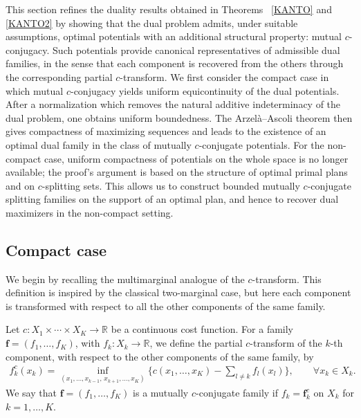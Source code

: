 \documentclass[twoside,11pt,a4paper]{article}
\newcommand*{\SavedRef}{}
\let\SavedRef\ref
\renewcommand*{\ref}[1]{  \begingroup
    \hypersetup{
      linkcolor=linkequation,
      linkbordercolor=linkequation,
    }    \SavedRef{#1}  \endgroup
}
\begin{document}
This section refines the duality results obtained in Theorems~\ref{KANTO} and~\ref{KANTO2} by showing that the dual problem admits, under suitable assumptions, optimal potentials with an additional structural property: mutual \(c\)-conjugacy. Such potentials provide canonical representatives of admissible dual families, in the sense that each component is recovered from the others through the corresponding partial \(c\)-transform. We first consider the compact case in which mutual \(c\)-conjugacy yields uniform equicontinuity of the dual potentials. After a normalization which removes the natural additive indeterminacy of the dual problem, one obtains uniform boundedness. The Arzelà--Ascoli theorem then gives compactness of maximizing sequences and leads to the existence of an optimal dual family in the class of mutually \(c\)-conjugate potentials. For the non-compact case,  uniform compactness of potentials on the whole space is no longer available; the proof's argument is based on the structure of optimal primal plans and on \(c\)-splitting sets. This allows us to construct bounded mutually \(c\)-conjugate splitting families on the support of an optimal plan, and hence to recover dual maximizers in the non-compact setting.





\subsection{Compact case}

We begin by recalling the multimarginal analogue of the \(c\)-transform. This definition is inspired by the classical two-marginal case, but here each component is transformed with respect to all the other components of the same family.

\begin{definition}\label{con}
Let $c:X_1\times\cdots\times X_K\longrightarrow \mathbb R$
be a continuous cost function. For a family
\(\boldsymbol f=(f_1,\ldots,f_K)\), with \(f_k:X_k\to\mathbb R\), we define the
partial \(c\)-transform of the \(k\)-th component, with respect to the other
components of the same family, by
\begin{align*}
f_k^{c}(x_k)
=
\inf_{(x_1,\dots,x_{k-1},\,x_{k+1},\dots,x_K)}
\Big\{
c(x_1,\ldots,x_K)
-
\sum_{l\ne k} f_l(x_l)
\Big\},
\qquad \forall x_k \in X_k.
\end{align*}
We say that \(\boldsymbol f=(f_1,\ldots,f_K)\) is a mutually \(c\)-conjugate family if
$f_k=\boldsymbol f_k^{c}$
on $X_k$ for $k=1,\ldots,K$.
\end{definition}
\end{document}
